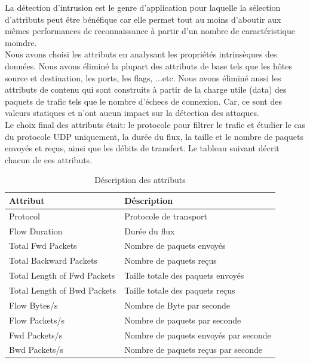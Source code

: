 \noindent La détection d’intrusion est le genre d’application pour laquelle la sélection d’attributs peut être bénéfique car elle permet tout au moins d’aboutir aux mêmes performances de reconnaissance à partir d’un nombre de caractéristique moindre.\\

\noindent Nous avons choisi les attributs en analysant les propriétés intrinsèques des données. Nous avons éliminé la plupart des attributs de base tels que  les hôtes source et destination, les ports, les flags, ...etc. Nous avons éliminé aussi les attributs de contenu qui sont construits à partir de la charge utile (data) des paquets de trafic tels que le nombre d’échecs de connexion.  Car, ce sont des valeurs statiques et n’ont aucun impact sur la détection des attaques.\\

\noindent Le choix final des attributs était: le protocole pour filtrer le trafic et étudier le cas du protocole UDP uniquement, la durée du flux, la taille et le nombre de paquets envoyés et reçus, ainsi que les débits de transfert. Le tableau suivant décrit chacun de ces attributs.
\begin{table}[h]
\begin{center}
\begin{tabular}{ | m{4cm} | m{10cm} | }
\hline
\rowcolor[rgb]{0.85,0.85,0.85}
\textbf{Attribut} & \textbf{Déscription}\\
\hline
Protocol & Protocole de transport\\
\hline
Flow Duration & Durée du flux\\
\hline
Total Fwd Packets & Nombre de paquets envoyés \\
\hline
Total Backward Packets &  Nombre de paquets reçus \\
\hline
Total Length of Fwd Packets & Taille totale des paquets envoyés \\
\hline
Total Length of Bwd Packets & Taille totale des paquets reçus \\
\hline
Flow Bytes/s &  Nombre de Byte par seconde\\ 
\hline
Flow Packets/s &  Nombre de paquets par seconde\\
\hline
Fwd Packets/s & Nombre de paquets envoyés par seconde \\
\hline
Bwd Packets/s & Nombre de paquets reçus par seconde \\
\hline
\end{tabular}
\caption{Déscription des attributs}
\label{table:attributs}
\end{center}
\end{table}

